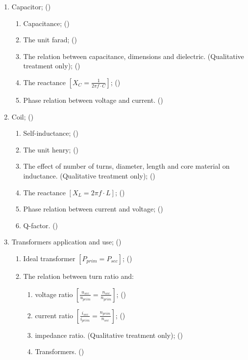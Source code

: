 \begin{flushleft}
\begin{enumerate}
\begin{enumerate}
\item Capacitor; ()\label{HAREC.a.2.2}
\begin{enumerate}
\item Capacitance; ()\label{HAREC.a.2.2.1}
\item The unit farad; ()\label{HAREC.a.2.2.2}
\item The relation between capacitance, dimensions and dielectric.
  (Qualitative treatment only); ()\label{HAREC.a.2.2.3}
\item The reactance \(\left[X_C = \frac{1}{2\pi f \cdot C}\right]\);
  ()\label{HAREC.a.2.2.4}
\item Phase relation between voltage and current.
  ()\label{HAREC.a.2.2.5}
\end{enumerate}

\item Coil; ()\label{HAREC.a.2.3}
\begin{enumerate}
\item Self-inductance; ()\label{HAREC.a.2.3.1}
\item The unit henry; ()\label{HAREC.a.2.3.2}
\item The effect of number of turns, diameter, length and core material on
  inductance. (Qualitative treatment only);
  ()\label{HAREC.a.2.3.3}
\item The reactance  \(\left[X_L = 2\pi f \cdot L\right]\);
  ()\label{HAREC.a.2.3.4}
\item Phase relation between current and voltage;
  ()\label{HAREC.a.2.3.5}
\item Q-factor. ()\label{HAREC.a.2.3.6}
\end{enumerate}

\item Transformers application and use; ()\label{HAREC.a.2.4}
\begin{enumerate}
\item Ideal transformer \(\left[P_{prim} = P_{sec}\right]\);
  ()\label{HAREC.a.2.4.1}
\item The relation between turn ratio and:
\begin{enumerate}
\item voltage ratio
  \(\left[\frac{u_{sec}}{u_{prim}} = \frac{n_{sec}}{n_{prim}}\right]\);
  ()\label{HAREC.a.2.4.2.1}
\item current ratio
  \(\left[\frac{i_{sec}}{i_{prim}} = \frac{n_{prim}}{n_{sec}}\right]\);
  ()\label{HAREC.a.2.4.2.2}
\item impedance ratio. (Qualitative treatment only);
  ()\label{HAREC.a.2.4.2.3}
\item Transformers. ()\label{HAREC.a.2.4.2.4}
\end{enumerate}
\end{enumerate}


\end{enumerate}
\end{enumerate}
\end{flushleft}
